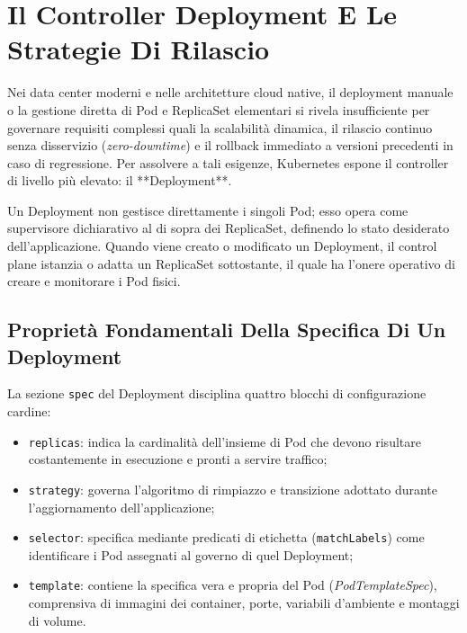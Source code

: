 \documentclass[11pt, a4paper]{article}
\begin{document}
\newpage


\section{Il Controller Deployment E Le Strategie Di Rilascio}

Nei data center moderni e nelle architetture cloud native, il deployment manuale o la gestione diretta di Pod e ReplicaSet elementari si rivela insufficiente per governare requisiti complessi quali la scalabilità dinamica, il rilascio continuo senza disservizio (\emph{zero-downtime}) e il rollback immediato a versioni precedenti in caso di regressione. Per assolvere a tali esigenze, Kubernetes espone il controller di livello più elevato: il **Deployment**.

Un Deployment non gestisce direttamente i singoli Pod; esso opera come supervisore dichiarativo al di sopra dei ReplicaSet, definendo lo stato desiderato dell'applicazione. Quando viene creato o modificato un Deployment, il control plane istanzia o adatta un ReplicaSet sottostante, il quale ha l'onere operativo di creare e monitorare i Pod fisici.


\subsection{Proprietà Fondamentali Della Specifica Di Un Deployment}

La sezione \texttt{spec} del Deployment disciplina quattro blocchi di configurazione cardine:
\begin{itemize}[noitemsep]
    \item \texttt{replicas}: indica la cardinalità dell'insieme di Pod che devono risultare costantemente in esecuzione e pronti a servire traffico;
    \item \texttt{strategy}: governa l'algoritmo di rimpiazzo e transizione adottato durante l'aggiornamento dell'applicazione;
    \item \texttt{selector}: specifica mediante predicati di etichetta (\texttt{matchLabels}) come identificare i Pod assegnati al governo di quel Deployment;
    \item \texttt{template}: contiene la specifica vera e propria del Pod (\emph{PodTemplateSpec}), comprensiva di immagini dei container, porte, variabili d'ambiente e montaggi di volume.
\end{itemize}
\end{document}
